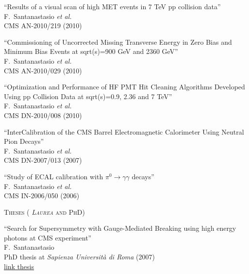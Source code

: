 \documentclass[10pt, a4paper]{article}
\begin{document}
\begin{thebibliography}{599}
``Results of a visual scan of high MET events in 7 TeV pp collision data''
  \\{}F.~Santanastasio {\it et al.}
  \\{}CMS AN-2010/219 (2010)
  
``Commissioning of Uncorrected Missing Transverse Energy in Zero Bias and Minimum Bias Events at  sqrt(s)=900 GeV and  2360 GeV''
  \\{}F.~Santanastasio {\it et al.}
  \\{}CMS AN-2010/029 (2010)

``Optimization and Performance of HF PMT Hit Cleaning Algorithms Developed Using pp Collision Data at sqrt(s)=0.9, 2.36 and 7 TeV''
  \\{}F.~Santanastasio {\it et al.}
  \\{}CMS DN-2010/008 (2010)

``InterCalibration of the CMS Barrel Electromagnetic Calorimeter Using Neutral Pion Decays''
   \\{}F.~Santanastasio {\it et al.}
  \\{}CMS DN-2007/013 (2007)

``Study of ECAL calibration with $\pi^0 \rightarrow \gamma \gamma$ decays''
\\{}F.~Santanastasio {\it et al.}
\\{}CMS IN-2006/050 (2006)


\vspace{0.1cm} \begin{center} \textsc{Theses ( \textit{Laurea} and PhD)} \end{center} \vspace{0.05cm}

``Search for Supersymmetry with Gauge-Mediated Breaking using high energy photons at CMS experiment''
  \\{}F.~Santanastasio
  \\{}PhD thesis at \textit{Sapienza Universit\`a di Roma} (2007)
 \\{}\href{https://www.roma1.infn.it/exp/cms/tesiPHD/tesi_phd_completate/santanastasio.pdf}{link thesis}


\end{thebibliography}
\end{document}
